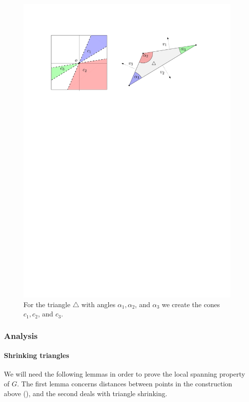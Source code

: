 \documentclass[12pt]{article}%
\begin{document}
\begin{figure}[h]
    \centering \includegraphics{figs/triangle_cones}
    \caption{For the triangle $\triangle$ with angles
       $\alpha_1,\alpha_2$, and $\alpha_3$ we create the cones
       $c_1,c_2$, and $c_3$.}
\end{figure}
\subsubsection{Analysis}


\paragraph{Shrinking triangles}
We will need the following lemmas in order to prove the local spanning
property of $G$. The first lemma concerns distances between points in
the construction above (), and the second
deals with triangle shrinking.
\end{document}
